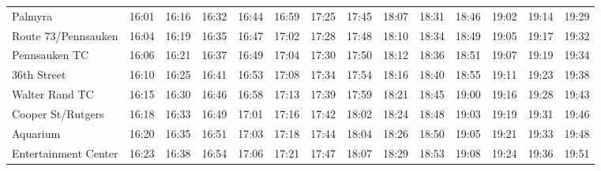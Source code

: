 \begin{center}
\begin{tabular}{@{}lrrrrrrrrrrrrr@{}}
Palmyra & 16:01 & 16:16 & 16:32 & 16:44 & 16:59 & 17:25 & 17:45 & 18:07 & 18:31 & 18:46 & 19:02 & 19:14 & 19:29 \\
Route 73/Pennsauken & 16:04 & 16:19 & 16:35 & 16:47 & 17:02 & 17:28 & 17:48 & 18:10 & 18:34 & 18:49 & 19:05 & 19:17 & 19:32 \\
Pennsauken TC & 16:06 & 16:21 & 16:37 & 16:49 & 17:04 & 17:30 & 17:50 & 18:12 & 18:36 & 18:51 & 19:07 & 19:19 & 19:34 \\
36th Street & 16:10 & 16:25 & 16:41 & 16:53 & 17:08 & 17:34 & 17:54 & 18:16 & 18:40 & 18:55 & 19:11 & 19:23 & 19:38 \\
Walter Rand TC & 16:15 & 16:30 & 16:46 & 16:58 & 17:13 & 17:39 & 17:59 & 18:21 & 18:45 & 19:00 & 19:16 & 19:28 & 19:43 \\
Cooper St/Rutgers & 16:18 & 16:33 & 16:49 & 17:01 & 17:16 & 17:42 & 18:02 & 18:24 & 18:48 & 19:03 & 19:19 & 19:31 & 19:46 \\
Aquarium & 16:20 & 16:35 & 16:51 & 17:03 & 17:18 & 17:44 & 18:04 & 18:26 & 18:50 & 19:05 & 19:21 & 19:33 & 19:48 \\
Entertainment Center & 16:23 & 16:38 & 16:54 & 17:06 & 17:21 & 17:47 & 18:07 & 18:29 & 18:53 & 19:08 & 19:24 & 19:36 & 19:51 \\
\bottomrule\end{tabular}\end{center}
